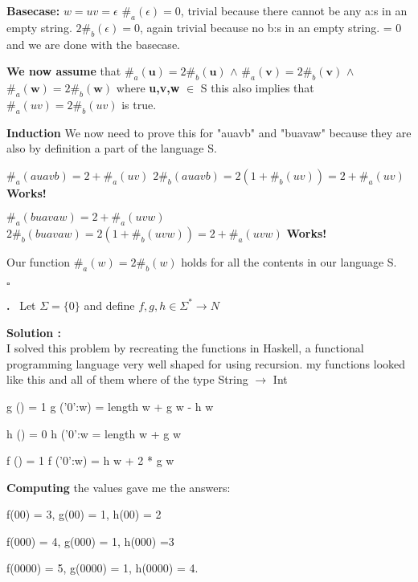 \documentclass{article}
\newcounter{problem}
\newcounter{solution}
\newcommand\Problem{%
  \stepcounter{problem}%
  \textbf{\theproblem.}~%
  \setcounter{solution}{0}%
}
\newcommand\ASolution{%
  \stepcounter{solution}%
  \textbf{Solution \thesolution:}\\%
}
\begin{document}
\textbf{Basecase:} $w = uv = \epsilon$ \newline
$\#_a (\epsilon) = 0$, trivial because there cannot be any a:s in an empty 
string.\newline
$2\#_b (\epsilon) = 0$, again trivial because no b:s in an empty string. = 0 and we are done with the basecase.

\textbf{We now assume} that $\#_a (\textbf{u}) = 2\#_b (\textbf{u})$ $\wedge$ $\#_a
(\textbf{v}) = 2\#_b (\textbf{v})$ $\wedge$ $\#_a (\textbf{w}) = 2\#_b 
(\textbf{w})$ \newline
where \textbf{u,v,w} $\in$ S this also implies that $\#_a (uv) = 2\#_b(uv)$ is 
true.

\textbf{Induction}\newline
We now need to prove this for "auavb" and "buavaw" because they are also by 
definition a part of the language S.

$\#_a (auavb) = 2 + \#_a(uv)$ \newline
$2\#_b (auavb) = 2(1 + \#_b (uv)) = 2 + \#_a(uv)$ \newline
\textbf{Works!}

$\#_a (buavaw) = 2 + \#_a (uvw)$ \newline
$2\#_b (buavaw) = 2(1 + \#_b (uvw)) = 2 + \#_a (uvw)$ \newline
\textbf{Works!}

Our function $\#_a(w) = 2\#_b(w)$ holds for all the contents in our language S.

\hfill
$\square$
\newpage

\Problem Let $\Sigma = \{0\}$ and define $f,g,h \in \Sigma^* \rightarrow N$

\ASolution I solved this problem by recreating the functions in Haskell, a 
functional programming language very well shaped for using recursion. my functions looked like this and all of them where of the type String $\rightarrow$ Int

g () = 1 \newline
g ('0':w) = length w + g w - h w

h () = 0 \newline
h ('0':w = length w + g w

f () = 1 \newline
f ('0':w) = h w + 2 * g w

\textbf{Computing} the values gave me the answers:
\begin{center}
    f(00) = 3, g(00) = 1, h(00) = 2
    
    f(000) = 4, g(000) = 1, h(000) =3
    
    f(0000) = 5, g(0000) = 1, h(0000) = 4.
\end{center}
\end{document}
